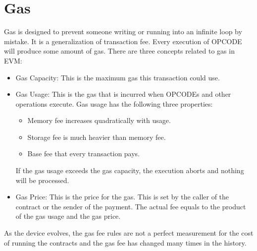 \documentclass{article}
\begin{document}
\section*{Gas}
Gas is designed to prevent someone writing or running into an infinite loop by mistake. It is a generalization of transaction fee. Every execution of OPCODE will produce some amount of gas. There are three concepts related to gas in EVM:
\begin{itemize}
  \item Gas Capacity: This is the maximum gas this transaction could use.
  \item Gas Usage: This is the gas that is incurred when OPCODEs and other operations execute. Gas usage has the following three properties:
  \begin{itemize}
  \item Memory fee increases quadratically with usage.
  \item Storage fee is much heavier than memory fee.
  \item Base fee that every transaction pays.
  \end{itemize}
  If the gas usage exceeds the gas capacity, the execution aborts and nothing will be processed.
  \item Gas Price: This is the price for the gas. This is set by the caller of the contract or the sender of the payment. The actual fee equals to the product of the gas usage and the gas price.
\end{itemize}
As the device evolves, the gas fee rules are not a perfect measurement for the cost of running the contracts and the gas fee has changed many times in the history.
\end{document}
